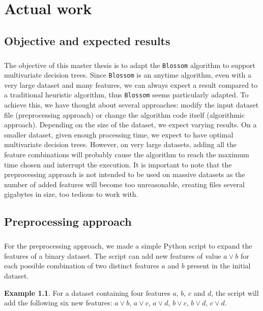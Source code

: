 \documentclass[12pt]{report}
\theoremstyle{definition}
\newtheorem*{example}{Example}
\theoremstyle{definition}
\theoremstyle{definition}
\begin{document}
\chapter{Actual work}
\section{Objective and expected results}
\paragraph{} The objective of this master thesis is to adapt the \texttt{Blossom} algorithm to support multivariate
decision trees. Since \texttt{Blossom} is an anytime algorithm, even with a very large dataset and many features,
we can always expect a result compared to a traditional heuristic algorithm, thus \texttt{Blossom} seems particularly
adapted. To achieve this, we have thought about several approaches: modify the input dataset file (preprocessing approach)
or change the algorithm code itself (algorithmic approach). Depending on the size of the dataset, we expect varying results.
On a smaller dataset, given enough processing time, we expect to have optimal multivariate decision trees. However, on very
large datasets, adding all the feature combinations will probably cause the algorithm to reach the maximum time chosen and
interrupt the execution. It is important to note that the preprocessing approach is not intended to be used on massive
datasets as the number of added features will become too unreasonable, creating files several gigabytes in size, too
tedious to work with.


\section{Preprocessing approach}
\paragraph{} For the preprocessing approach, we made a simple Python script to expand the features of a binary
dataset. The script can add new features of value $a \lor b$ for each possible combination of two distinct
features $a$ and $b$ present in the initial dataset.

\begin{example}
    For a dataset containing four features $a$, $b$, $c$ and $d$, the script will add the following six new
    features: $a \lor b$, $a \lor c$, $a \lor d$, $b \lor c$, $b \lor d$, $c \lor d$.
\end{example}
\end{document}
